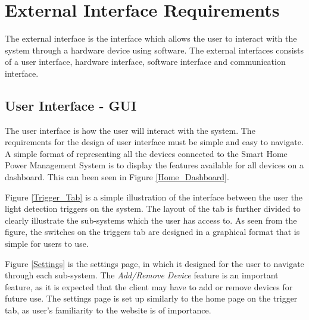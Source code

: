 \documentclass[11pt, a4paper]{article}
\begin{document}
	\section{External Interface Requirements}
	The external interface is the interface which allows the user to interact with the system through a hardware device using software. The external interfaces consists of a user interface, hardware interface, software interface and communication interface. 
	
	\subsection{User Interface - GUI}
	The user interface is how the user will interact with the system. The requirements for the design of user interface must be simple and easy to navigate. A simple format of representing all the devices connected to the Smart Home Power Management System is to display the features available for all devices on a dashboard. This can been seen in Figure \ref{Home_Dashboard}.
	
	\noindent
	Figure \ref{Trigger_Tab} is a simple illustration of the interface between the user the light detection triggers on the system. The layout of the tab is further divided to clearly illustrate the sub-systems which the user has access to. As seen from the figure, the switches on the triggers tab are designed in a graphical format that is simple for users to use.  
	
	\noindent
	Figure \ref{Settings} is the settings page, in which it designed for the user to navigate through each sub-system. The \textit{Add/Remove Device} feature is an important feature, as it is expected that the client may have to add or remove devices for future use. The settings page is set up similarly to the home page on the trigger tab, as user's  familiarity to the website is of importance.
	
\end{document}
